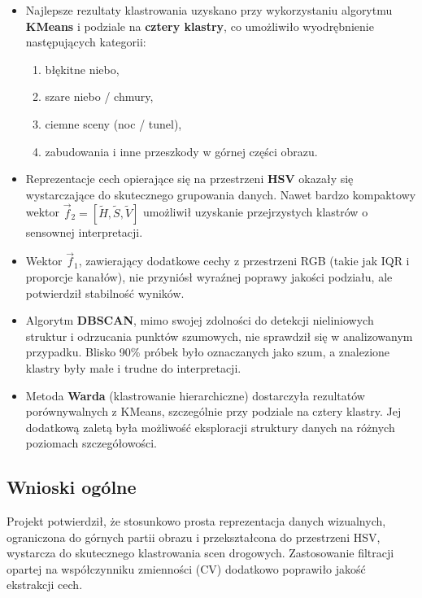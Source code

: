 \documentclass[12pt]{article}
\begin{document}
\begin{itemize}
    \item Najlepsze rezultaty klastrowania uzyskano przy wykorzystaniu algorytmu \textbf{KMeans} i podziale na \textbf{cztery klastry}, co umożliwiło wyodrębnienie następujących kategorii:
          \begin{enumerate}
              \item błękitne niebo,
              \item szare niebo / chmury,
              \item ciemne sceny (noc / tunel),
              \item zabudowania i inne przeszkody w górnej części obrazu.
          \end{enumerate}

    \item Reprezentacje cech opierające się na przestrzeni \textbf{HSV} okazały się wystarczające do skutecznego grupowania danych. Nawet bardzo kompaktowy wektor \(\vec{f}_2 = [\widetilde{H}, \widetilde{S}, \widetilde{V}]\) umożliwił uzyskanie przejrzystych klastrów o sensownej interpretacji.

    \item Wektor \(\vec{f}_1\), zawierający dodatkowe cechy z przestrzeni RGB (takie jak IQR i proporcje kanałów), nie przyniósł wyraźnej poprawy jakości podziału, ale potwierdził stabilność wyników.

    \item Algorytm \textbf{DBSCAN}, mimo swojej zdolności do detekcji nieliniowych struktur i odrzucania punktów szumowych, nie sprawdził się w analizowanym przypadku. Blisko 90\% próbek było oznaczanych jako szum, a znalezione klastry były małe i trudne do interpretacji.

    \item Metoda \textbf{Warda} (klastrowanie hierarchiczne) dostarczyła rezultatów porównywalnych z KMeans, szczególnie przy podziale na cztery klastry. Jej dodatkową zaletą była możliwość eksploracji struktury danych na różnych poziomach szczegółowości.
\end{itemize}

\subsection*{Wnioski ogólne}

Projekt potwierdził, że stosunkowo prosta reprezentacja danych wizualnych, ograniczona do górnych partii obrazu i przekształcona do przestrzeni HSV, wystarcza do skutecznego klastrowania scen drogowych. Zastosowanie filtracji opartej na współczynniku zmienności (CV) dodatkowo poprawiło jakość ekstrakcji cech.
\end{document}
